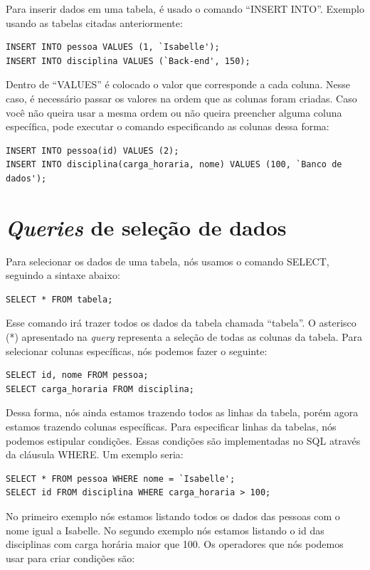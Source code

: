 \documentclass[
	12pt,				%
	openright,			%
	oneside,			%
	a4paper,			%
	english,			%
	french,				%
	spanish,			%
	brazil,				%
	]{abntex2}
\begin{document}
Para inserir dados em uma tabela, é usado o comando ``INSERT INTO''. Exemplo usando as tabelas citadas anteriormente: 
\begin{verbatim}
INSERT INTO pessoa VALUES (1, `Isabelle');
INSERT INTO disciplina VALUES (`Back-end', 150);
\end{verbatim}

Dentro de ``VALUES'' é colocado o valor que corresponde a cada coluna. Nesse caso, é necessário passar os valores na ordem que as colunas foram criadas. Caso você não queira usar a mesma ordem ou não queira preencher alguma coluna específica, pode executar o comando especificando as colunas dessa forma:
\begin{verbatim}
INSERT INTO pessoa(id) VALUES (2);
INSERT INTO disciplina(carga_horaria, nome) VALUES (100, `Banco de dados');
\end{verbatim}

\section{\textit{Queries} de seleção de dados}

Para selecionar os dados de uma tabela, nós usamos o comando SELECT, seguindo a sintaxe abaixo:
\begin{verbatim}
SELECT * FROM tabela;
\end{verbatim}

Esse comando irá trazer todos os dados da tabela chamada ``tabela''. O asterisco (*) apresentado na \textit{query} representa a seleção de todas as colunas da tabela. Para selecionar colunas específicas, nós podemos fazer o seguinte:
\begin{verbatim}
SELECT id, nome FROM pessoa;
SELECT carga_horaria FROM disciplina;
\end{verbatim}

Dessa forma, nós ainda estamos trazendo todos as linhas da tabela, porém agora estamos trazendo colunas específicas. Para especificar linhas da tabelas, nós podemos estipular condições. Essas condições são implementadas no SQL através da cláusula WHERE. Um exemplo seria:

\begin{verbatim}
SELECT * FROM pessoa WHERE nome = `Isabelle';
SELECT id FROM disciplina WHERE carga_horaria > 100;
\end{verbatim}

No primeiro exemplo nós estamos listando todos os dados das pessoas com o nome igual a Isabelle. No segundo exemplo nós estamos listando o id das disciplinas com carga horária maior que 100. Os operadores que nós podemos usar para criar condições são:
\end{document}
